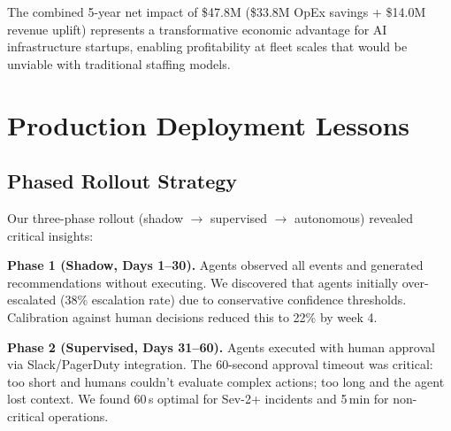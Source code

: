 \documentclass[conference,10pt,letterpaper]{IEEEtran}
\begin{document}
\begin{table}[!t]
\caption{5-Year TCO: Traditional vs.\ AgentInfer Operations}
\label{tab:tco}
\centering\scriptsize
{}
\end{table}

The combined 5-year net impact of \$47.8M (\$33.8M OpEx savings + \$14.0M revenue uplift) represents a transformative economic advantage for AI infrastructure startups, enabling profitability at fleet scales that would be unviable with traditional staffing models.


\section{Production Deployment Lessons}
\label{sec:lessons}

\subsection{Phased Rollout Strategy}

Our three-phase rollout (shadow $\to$ supervised $\to$ autonomous) revealed critical insights:

\textbf{Phase 1 (Shadow, Days 1--30).} Agents observed all events and generated recommendations without executing. We discovered that agents initially over-escalated (38\% escalation rate) due to conservative confidence thresholds. Calibration against human decisions reduced this to 22\% by week 4.

\textbf{Phase 2 (Supervised, Days 31--60).} Agents executed with human approval via Slack/PagerDuty integration. The 60-second approval timeout was critical: too short and humans couldn't evaluate complex actions; too long and the agent lost context. We found 60\,s optimal for Sev-2+ incidents and 5\,min for non-critical operations.
\end{document}
